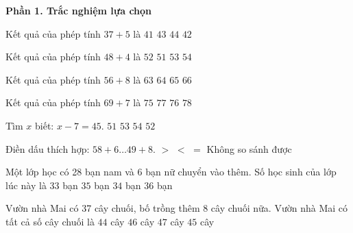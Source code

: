 \textbf{Phần 1. Trắc nghiệm lựa chọn}

\begin{ex} %
Kết quả của phép tính $37 + 5$ là
\choice
{$41$}
{$43$}
{$44$}
{\True $42$}
\end{ex}

\begin{ex} %
Kết quả của phép tính $48 + 4$ là
\choice
{\True $52$}
{$51$}
{$53$}
{$54$}
\end{ex}

\begin{ex} %
Kết quả của phép tính $56 + 8$ là
\choice
{$63$}
{\True $64$}
{$65$}
{$66$}
\end{ex}

\begin{ex} %
Kết quả của phép tính $69 + 7$ là
\choice
{$75$}
{$77$}
{\True $76$}
{$78$}
\end{ex}

\begin{ex} %
Tìm $x$ biết: $x - 7 = 45$.
\choice
{$51$}
{$53$}
{$54$}
{\True $52$}
\end{ex}

\begin{ex} %
Điền dấu thích hợp: $58 + 6 \dots 49 + 8$.
\choice
{\True $>$}
{$<$}
{$=$}
{Không so sánh được}
\end{ex}

\begin{ex} %
Một lớp học có 28 bạn nam và 6 bạn nữ chuyển vào thêm. Số học sinh của lớp lúc này là
\choice
{$33$ bạn}
{$35$ bạn}
{\True $34$ bạn}
{$36$ bạn}
\end{ex}

\begin{ex} %
Vườn nhà Mai có 37 cây chuối, bố trồng thêm 8 cây chuối nữa. Vườn nhà Mai có tất cả số cây chuối là
\choice
{$44$ cây}
{$46$ cây}
{$47$ cây}
{\True $45$ cây}
\end{ex}

